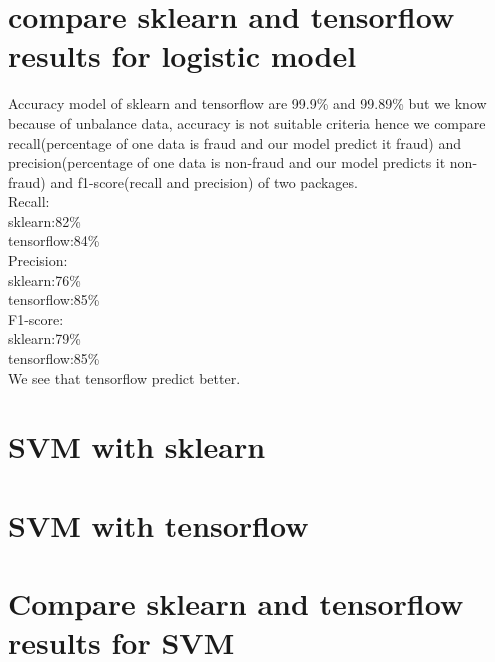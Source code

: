\documentclass[17pt]{report}
\begin{document}
\section{compare sklearn and tensorflow results for logistic model}
Accuracy model of sklearn and tensorflow are  99.9\% and 99.89\% but we know because of unbalance data, accuracy is not suitable criteria hence we compare recall(percentage of one data is fraud and our model predict it fraud) and precision(percentage of one data is non-fraud and our model predicts it non-fraud) and f1-score(recall and precision) of two packages.\\
Recall:\\
sklearn:82\%\\
tensorflow:84\%\\
Precision:\\
sklearn:76\%\\
tensorflow:85\%\\
F1-score:\\
sklearn:79\%\\
tensorflow:85\%\\  
We see that tensorflow predict better.
\section{SVM with sklearn}

\section{SVM with tensorflow}
	
\section{Compare sklearn and tensorflow results for SVM}
\end{document}
